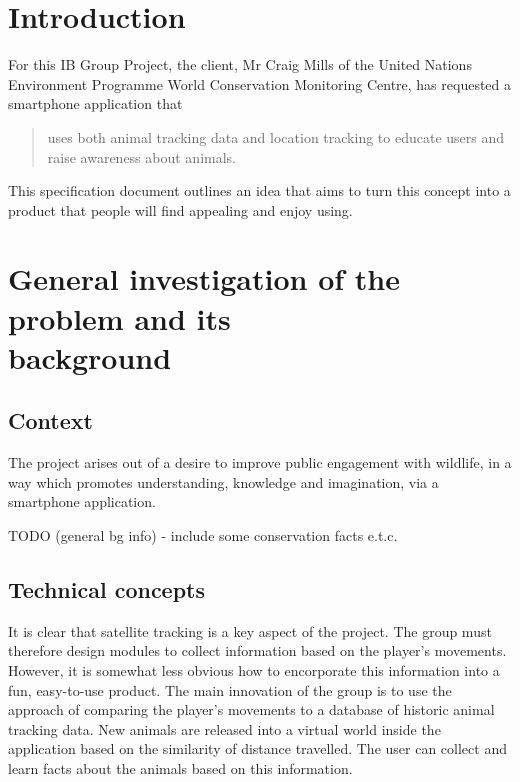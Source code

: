 \documentclass[12pt,a4paper,twoside]{article}
\begin{document}

\newpage
\pagestyle{empty}
\cleardoublepage                             %
\newpage


\section{Introduction}

For this IB Group Project, the client, Mr Craig Mills of the United Nations Environment Programme World Conservation Monitoring Centre, has requested a smartphone application that

\begin{quote}
uses both animal tracking data and location tracking to educate users and raise awareness about animals.
\end{quote}

This specification document outlines an idea that aims to turn this concept into a product that people will find appealing and enjoy using.

\section{General investigation of the problem and its \\ background}
\subsection{Context}

The project arises out of a desire to improve public engagement with wildlife, in a way which promotes understanding, knowledge and imagination, via a smartphone application.

TODO (general bg info) - include some conservation facts e.t.c.

\subsection{Technical concepts}
It is clear that satellite tracking is a key aspect of the project.
The group must therefore design modules to collect information based on the player's movements.
However, it is somewhat less obvious how to encorporate this information into a fun, easy-to-use product.
The main innovation of the group is to use the approach of comparing the player's movements to a database of historic animal tracking data.
New animals are released into a virtual world inside the application based on the similarity of distance travelled.          %
The user can collect and learn facts about the animals based on this information.   %
\end{document}
